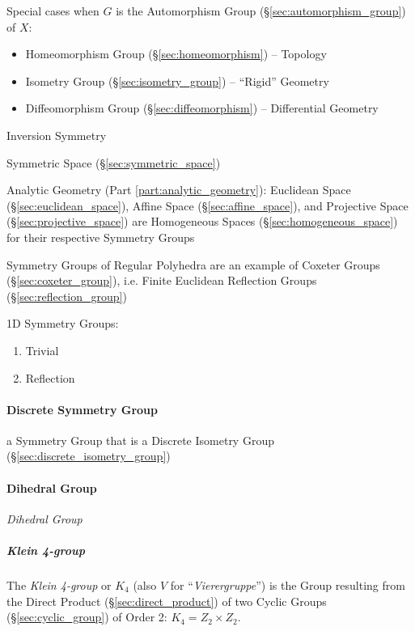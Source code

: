 Special cases when $G$ is the Automorphism Group
(\S\ref{sec:automorphism_group}) of $X$:
\begin{itemize}
  \item Homeomorphism Group (\S\ref{sec:homeomorphism}) -- Topology
  \item Isometry Group (\S\ref{sec:isometry_group}) -- ``Rigid'' Geometry
  \item Diffeomorphism Group (\S\ref{sec:diffeomorphism}) -- Differential
    Geometry
\end{itemize}


Inversion Symmetry %

\fist Symmetric Space (\S\ref{sec:symmetric_space})

Analytic Geometry (Part \ref{part:analytic_geometry}): Euclidean Space
(\S\ref{sec:euclidean_space}), Affine Space (\S\ref{sec:affine_space}), and
Projective Space (\S\ref{sec:projective_space}) are Homogeneous Spaces
(\S\ref{sec:homogeneous_space}) for their respective Symmetry Groups

Symmetry Groups of Regular Polyhedra are an example of Coxeter Groups
(\S\ref{sec:coxeter_group}), i.e. Finite Euclidean Reflection Groups
(\S\ref{sec:reflection_group})

1D Symmetry Groups: %
\begin{enumerate}
  \item Trivial
  \item Reflection
\end{enumerate}



\paragraph{Discrete Symmetry Group}\label{sec:discrete_symmetry_group}\hfill

a Symmetry Group that is a Discrete Isometry Group
(\S\ref{sec:discrete_isometry_group})



\paragraph{Dihedral Group}\label{sec:dihedral_group}\hfill

\emph{Dihedral Group}


\subparagraph{Klein 4-group}\label{sec:klein_4group}\hfill

The \emph{Klein 4-group} or $K_4$ (also $V$ for
``\emph{Vierergruppe}'') is the Group resulting from the Direct
Product (\S\ref{sec:direct_product}) of two Cyclic Groups
(\S\ref{sec:cyclic_group}) of Order 2: $K_4 = Z_2 \times Z_2$.

